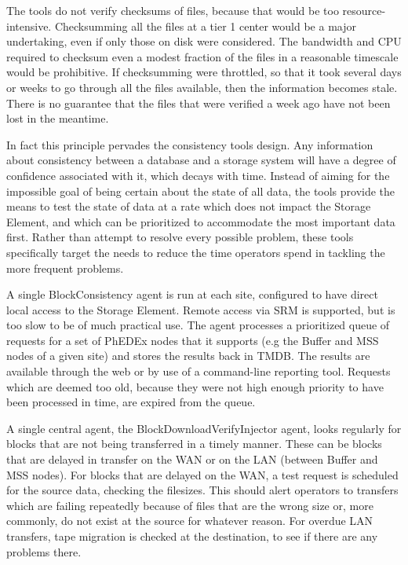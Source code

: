 \documentclass{PoS}
\begin{document}
The tools do not verify checksums of files, because that would be too
resource-intensive. Checksumming all the files at a tier 1 center would be a
major undertaking, even if only those on disk were considered. The
bandwidth and CPU required to checksum even a modest fraction of the
files in a reasonable timescale would be prohibitive. If checksumming
were throttled, so that it took several days or weeks to go through
all the files available, then the information becomes stale. There is
no guarantee that the files that were verified a week ago have not
been lost in the meantime.

In fact this principle pervades the consistency tools design. Any
information about consistency between a database and a storage system
will have a degree of confidence associated with it, which decays with
time. Instead of aiming for the impossible goal of being certain about
the state of all data, the tools provide the means to test the state
of data at a rate which does not impact the Storage Element, and which
can be prioritized to accommodate the most important data first. Rather
than attempt to resolve every possible problem, these tools
specifically target the needs to reduce the time operators spend in
tackling the more frequent problems.

A single BlockConsistency agent is run at each site, configured to
have direct local access to the Storage Element. Remote access via SRM
is supported, but is too slow to be of much practical use. The agent
processes a prioritized queue of requests for a set of PhEDEx nodes
that it supports (e.g the Buffer and MSS nodes of a given site) and
stores the results back in TMDB. The results are available through the
web or by use of a command-line reporting tool. Requests which are
deemed too old, because they were not high enough priority to have
been processed in time, are expired from the queue.

A single central agent, the BlockDownloadVerifyInjector agent, looks
regularly for blocks that are not being transferred in a timely
manner. These can be blocks that are delayed in transfer on the WAN or
on the LAN (between Buffer and MSS nodes). For blocks that are delayed
on the WAN, a test request is scheduled for the source data, checking
the filesizes. This should alert operators to transfers which are
failing repeatedly because of files that are the wrong size or, more
commonly, do not exist at the source for whatever reason. For overdue
LAN transfers, tape migration is checked at the destination, to see if
there are any problems there.
\end{document}
